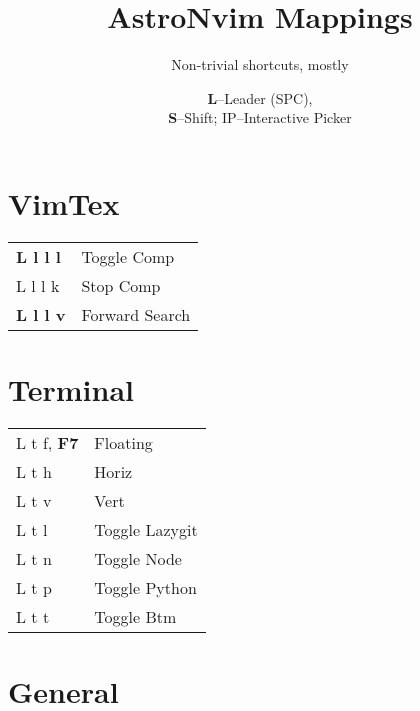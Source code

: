\documentclass[
  ,landscape
  ,columns=4
]{cheatsheet}
\title{AstroNvim Mappings}
\author{Non-trivial shortcuts, mostly}
\date{\textbf{L}--Leader (SPC),\\\textbf{S}--Shift; IP--Interactive Picker}
\begin{document}
\maketitle

\section{VimTex}

\begin{tabular}{ll}
	\textbf{L l l l} & Toggle Comp    \\
	L l l k          & Stop Comp      \\
	\textbf{L l l v} & Forward Search \\
\end{tabular}

\section{Terminal}

\begin{tabular}{ll}
	L t f, \textbf{F7} & Floating       \\
	L t h              & Horiz          \\
	L t v              & Vert           \\
	L t l              & Toggle Lazygit \\
	L t n              & Toggle Node    \\
	L t p              & Toggle Python  \\
	L t t              & Toggle Btm     \\
\end{tabular}

\section{General}
\end{document}
